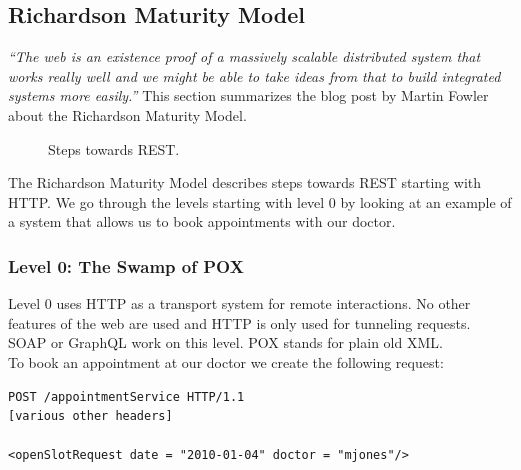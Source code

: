 \subsection{Richardson Maturity Model}\label{richardsonmaturitymodel}
\textit{``The web is an existence proof of a massively scalable distributed system that works really well and we might be able to take ideas from that to build integrated systems more easily.''} \citep{richardsonmaturitymodel} This section summarizes the blog post by Martin Fowler about the Richardson Maturity Model.

\begin{figure}[!htb]
  \caption{Steps towards REST.}
\end{figure}

The Richardson Maturity Model describes steps towards REST starting with HTTP. We go through the levels starting with level 0 by looking at an example of a system that allows us to book appointments with our doctor.

\subsubsection{Level 0: The Swamp of POX}
Level 0 uses HTTP as a transport system for remote interactions. No other features of the web are used and HTTP is only used for tunneling requests. SOAP or GraphQL work on this level. POX stands for plain old XML. \\
To book an appointment at our doctor we create the following request:

\lstset{language=XML}
\begin{lstlisting}[caption=Level 0: \gls{remoteprocedurecall} on HTTP]
POST /appointmentService HTTP/1.1
[various other headers]

<openSlotRequest date = "2010-01-04" doctor = "mjones"/>
\end{lstlisting}

